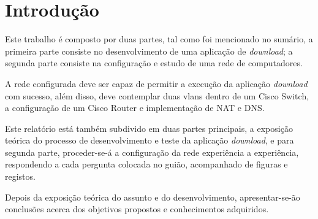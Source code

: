 \section*{Introdução}
Este trabalho é composto por duas partes, tal como foi mencionado no sumário, a primeira parte consiste no desenvolvimento de uma aplicação de \emph{download}; a segunda parte consiste na configuração e estudo de uma rede de computadores.

\noindent A rede configurada deve ser capaz de permitir a execução da aplicação \emph{download} com sucesso, além disso, deve contemplar duas vlans dentro de um Cisco Switch, a configuração de um Cisco Router e implementação de NAT e DNS.

\noindent Este relatório está também subdivido em duas partes principais, a exposição teórica do processo de desenvolvimento e teste da aplicação \emph{download}, e para segunda parte, proceder-se-á a configuração da rede experiência a experiência, respondendo a cada pergunta colocada no guião, acompanhado de figuras e registos.

\noindent Depois da exposição teórica do assunto e do desenvolvimento, apresentar-se-ão conclusões acerca dos objetivos propostos e conhecimentos adquiridos.